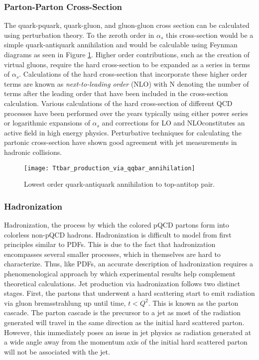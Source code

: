 \subsubsection{Parton-Parton Cross-Section}
The quark-pquark, quark-gluon, and gluon-gluon cross section can be calculated using perturbation theory.  To the zeroth order in $\alpha_{s}$ this cross-section would be a simple quark-antiquark annihilation and would be calculable using Feynman diagrams as seen in Figure \ref{fig:qqbar}\cite{Collins:1989gx}.  Higher order contributions, such as the creation of virtual gluons, require the hard cross-section to be expanded as a series in terms of $\alpha_{s}$.  Calculations of the hard cross-section that incorporate these higher order terms are known as \textit{next-to-leading order} (NLO) with N denoting the number of terms after the leading order that have been included in the cross-section calculation.  Various calculations of the hard cross-section of different QCD processes have been performed over the years typically using either power series or logarithmic expansions of $\alpha_{s}$\cite{Brambilla:2006wp} and corrections for LO and NLOconstitutes an active field in high energy physics.  Perturbative techniques for calculating the partonic cross-section have shown good agreement with jet measurements in hadronic collisions\cite{Fritzsch:1992mu}.

\begin{figure}[h]
\texttt{[image: Ttbar\_production\_via\_qqbar\_annihilation]}
\centering
\caption{Lowest order quark-antiquark annihilation to top-antitop pair\cite{Erdmann:2001ne}.}
\label{fig:qqbar}
\end{figure}

\subsubsection{Hadronization}

Hadronization, the process by which the colored pQCD partons form into colorless non-pQCD hadrons.  Hadronization is difficult to model from first principles similar to PDFs.  This is due to the fact that hadronization encompasses several smaller processes, which in themselves are hard to characterize. Thus, like PDFs, an accurate description of hadronization requires a phenomenological approach by which experimental results help complement theoretical calculations.  Jet production via hadronization\cite{Webber:1994zd} follows two distinct stages.  First, the partons that underwent a hard scattering start to emit radiation via gluon bremsstrahlung up until time, $t < Q^{2}$.  This is known as the parton cascade.  The parton cascade is the precursor to a jet as most of the radiation generated will travel in the same direction as the initial hard scattered parton.  However, this immediately poses an issue in jet physics as radiation generated at a wide angle away from the momentum axis of the initial hard scattered parton will not be associated with the jet.

